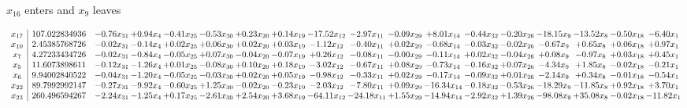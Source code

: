 \documentclass[9pt]{article}
\begin{document}
 $ x_{16} $ enters and $ x_{9} $ leaves 

 \[\begin{array}{c| c c@{\hskip 2pt} c@{\hskip 2pt} c@{\hskip 2pt} c@{\hskip 2pt} c@{\hskip 2pt} c@{\hskip 2pt} c@{\hskip 2pt} c@{\hskip 2pt} c@{\hskip 2pt} c@{\hskip 2pt} c@{\hskip 2pt} c@{\hskip 2pt} c@{\hskip 2pt} c@{\hskip 2pt} c@{\hskip 2pt} c@{\hskip 2pt} }
 x_{17}   &  107.022834936 & -0.76 x_{31} & +  0.94 x_{4} & -0.41 x_{25} & -0.53 x_{30} & +  0.23 x_{20} & +  0.14 x_{19} & -17.52 x_{12} & -2.97 x_{11} & -0.09 x_{29} & +  8.01 x_{14} & -0.44 x_{32} & -0.20 x_{26} & -18.15 x_{9} & -13.52 x_{8} & -0.50 x_{18} & -6.40 x_{1}\\
 x_{10}   &  2.45385768726 & -0.02 x_{31} & -0.14 x_{4} & +  0.02 x_{25} & +  0.06 x_{30} & +  0.02 x_{20} & +  0.03 x_{19} & -1.12 x_{12} & -0.40 x_{11} & +  0.02 x_{29} & -0.68 x_{14} & -0.03 x_{32} & -0.02 x_{26} & -0.67 x_{9} & +  0.65 x_{8} & +  0.06 x_{18} & +  0.97 x_{1}\\
 x_{7}   &  4.27233434726 & -0.02 x_{31} & -0.84 x_{4} & -0.05 x_{25} & +  0.07 x_{30} & -0.04 x_{20} & -0.07 x_{19} & +  0.26 x_{12} & -0.08 x_{11} & -0.00 x_{29} & -0.11 x_{14} & +  0.02 x_{32} & -0.04 x_{26} & +  0.08 x_{9} & -0.97 x_{8} & +  0.03 x_{18} & +  0.45 x_{1}\\
 x_{5}   &  11.6073898611 & -0.12 x_{31} & -1.26 x_{4} & +  0.01 x_{25} & -0.08 x_{30} & +  0.10 x_{20} & +  0.18 x_{19} & -3.02 x_{12} & -0.67 x_{11} & +  0.08 x_{29} & -0.73 x_{14} & -0.16 x_{32} & +  0.07 x_{26} & -4.34 x_{9} & +  1.85 x_{8} & -0.02 x_{18} & -0.21 x_{1}\\
 x_{6}   &  9.94002840522 & -0.04 x_{31} & -1.20 x_{4} & -0.05 x_{25} & -0.03 x_{30} & +  0.02 x_{20} & +  0.05 x_{19} & -0.98 x_{12} & -0.33 x_{11} & +  0.02 x_{29} & -0.17 x_{14} & -0.09 x_{32} & +  0.01 x_{26} & -2.14 x_{9} & +  0.34 x_{8} & -0.01 x_{18} & -0.54 x_{1}\\
 x_{22}   &  89.7992992147 & -0.27 x_{31} & -9.92 x_{4} & -0.60 x_{25} & +  1.25 x_{30} & -0.02 x_{20} & -0.23 x_{19} & -2.03 x_{12} & -7.80 x_{11} & +  0.09 x_{29} & -16.34 x_{14} & -0.18 x_{32} & -0.53 x_{26} & -18.29 x_{9} & -11.85 x_{8} & +  0.92 x_{18} & +  3.70 x_{1}\\
 x_{23}   &  260.496594267 & -2.24 x_{31} & -1.25 x_{4} & +  0.17 x_{25} & -2.61 x_{30} & +  2.54 x_{20} & +  3.68 x_{19} & -64.11 x_{12} & -24.18 x_{11} & +  1.55 x_{29} & -14.94 x_{14} & -2.92 x_{32} & +  1.39 x_{26} & -98.08 x_{9} & + 35.08 x_{8} & -0.02 x_{18} & -11.82 x_{1}\\

\end{array}\]
\end{document}

